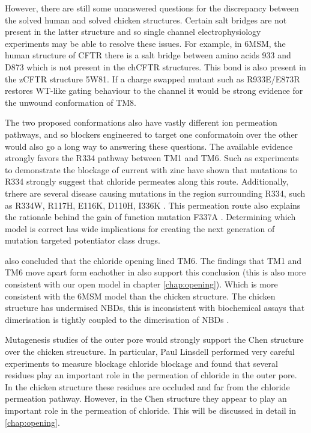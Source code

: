 However, there are still some unanswered questions for the discrepancy between the solved human and solved chicken structures. Certain salt bridges are not present in the latter structure and so single channel electrophysiology experiments may be able to resolve these issues. For example, in 6MSM, the human structure of CFTR there is a salt bridge between amino acids 933 and D873 which is not present in the chCFTR structures. This bond is also present in the zCFTR structure 5W81. If a charge swapped mutant such as R933E/E873R restores WT-like gating behaviour to the channel it would be  strong evidence for the unwound conformation of TM8. 

The two proposed conformations also have vastly different ion permeation pathways, and so blockers engineered to target one conformatoin over the other would also go a long way to answering these questions. The available evidence strongly favors the R334 pathway between TM1 and TM6. Such as experiments to  demonstrate the blockage of current with zinc have shown that mutations to R334 strongly suggest that chloride permeates along this route. Additionally, trhere are several disease causing mutations in the region surrounding R334, such as R334W, R117H, E116K, D110H, I336K \cite{cftr2}. This permeation route also explains the rationale behind the gain of function mutation F337A \cite{}. Determining which model is correct has wide implications for creating the next generation of mutation targeted potentiator class drugs.

\cite{gao2015} also concluded that the chloride opening lined TM6. The findings that TM1 and TM6 move apart form eachother in \cite{negoda2018} also support this conclusion (this is also more consistent with our open model in chapter \ref{chap:opening}). Which is more consistent with the 6MSM model than the chicken structure.
The chicken structure has undermised NBDs, this is inconsistent with biochemical assays that dimerisation is tightly coupled to the dimerisation of NBDs \cite{vergani2005, yeh2021}.

Mutagenesis studies of the outer pore would strongly support the Chen structure over the chicken streucture. In particular, Paul Linsdell performed very careful experiments to measure blockage chloride blockage and found that several residues play an important role in the permeation of chloride in the outer pore. In the chicken structure these residues are occluded and far from the chloride permeation pathway. However, in the Chen structure they appear to play an important role in the permeation of chloride. This will be discussed in detail in \ref{chap:opening}.

